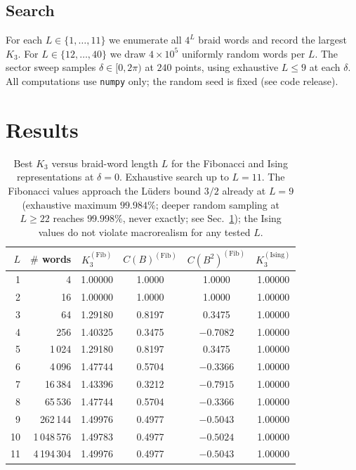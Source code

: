 \documentclass[aps,prx,reprint,amsmath,amssymb,floatfix,nofootinbib,superscriptaddress]{revtex4-2}
\begin{document}
\subsection{Search}

For each $L \in \{1,\ldots,11\}$ we enumerate all $4^{L}$ braid words
and record the largest $K_{3}$. For $L \in \{12,\ldots,40\}$ we draw
$4\times 10^{5}$ uniformly random words per $L$. The sector sweep
samples $\delta \in [0, 2\pi)$ at $240$ points, using exhaustive
$L \leq 9$ at each $\delta$. All computations use
\texttt{numpy} only; the random seed is fixed (see code release).

\section{Results}
\label{sec:results}

\begin{table}
\caption{Best $K_{3}$ versus braid-word length $L$ for the Fibonacci
and Ising representations at $\delta=0$. Exhaustive search up to
$L=11$. The Fibonacci values approach the L\"uders bound $3/2$
already at $L=9$ (exhaustive maximum $99.984\%$; deeper random
sampling at $L\ge 22$ reaches $99.998\%$, never exactly; see
Sec.~\ref{sec:results}); the Ising values do not violate macrorealism
for any tested $L$.}
\label{tab:K3_L}
\centering
\begin{tabular}{rrcccc}
\toprule
$L$ & $\#$ words & $K_{3}^{(\mathrm{Fib})}$ & $C(B)^{(\mathrm{Fib})}$
    & $C(B^{2})^{(\mathrm{Fib})}$ & $K_{3}^{(\mathrm{Ising})}$ \\
\midrule
1  & 4         & 1.00000 &  1.0000 &  1.0000 & 1.00000 \\
2  & 16        & 1.00000 &  1.0000 &  1.0000 & 1.00000 \\
3  & 64        & 1.29180 &  0.8197 &  0.3475 & 1.00000 \\
4  & 256       & 1.40325 &  0.3475 & $-0.7082$ & 1.00000 \\
5  & 1\,024    & 1.29180 &  0.8197 &  0.3475 & 1.00000 \\
6  & 4\,096    & 1.47744 &  0.5704 & $-0.3366$ & 1.00000 \\
7  & 16\,384   & 1.43396 &  0.3212 & $-0.7915$ & 1.00000 \\
8  & 65\,536   & 1.47744 &  0.5704 & $-0.3366$ & 1.00000 \\
9  & 262\,144  & 1.49976 &  0.4977 & $-0.5043$ & 1.00000 \\
10 & 1\,048\,576 & 1.49783 & 0.4977 & $-0.5024$ & 1.00000 \\
11 & 4\,194\,304 & 1.49976 & 0.4977 & $-0.5043$ & 1.00000 \\
\bottomrule
\end{tabular}
\end{table}
\end{document}
